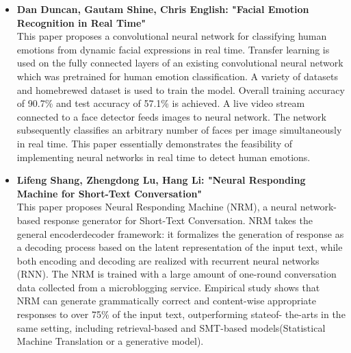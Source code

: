 \documentclass[oneside,a4paper,12pt]{report}
\begin{document}
\begin{normalsize}
\begin{itemize}
		\vspace{5mm}
	\item \textbf{Dan Duncan, Gautam Shine, Chris English:  "Facial Emotion Recognition in Real Time"} \cite{duncan16_facial_emotion_recog_real_time} \\
	This paper proposes a convolutional neural network for classifying human emotions from dynamic facial expressions in real time. Transfer learning is used on the fully connected layers of an existing convolutional neural network which was pretrained for human emotion classification. A variety of datasets and homebrewed dataset is used to train the model. Overall training accuracy of 90.7\% and test accuracy of 57.1\% is achieved. A live video stream connected to a face detector feeds images to neural network. The network subsequently classifies an arbitrary number of faces per image simultaneously in real time. This paper essentially demonstrates the feasibility of implementing neural networks in real time to detect human emotions.
	
		\vspace{5mm}
	\item \textbf{Lifeng Shang, Zhengdong Lu, Hang Li:  "Neural Responding Machine for Short-Text Conversation"} \cite{shang15_neural_respon_machin_short_text_conver} \\
	This paper proposes Neural Responding Machine (NRM), a neural network-based response generator for Short-Text Conversation. NRM takes the general encoderdecoder framework: it formalizes the generation of response as a decoding process based on the latent representation of the input text, while both encoding and decoding are realized with recurrent neural networks (RNN). The NRM is trained with a large amount of one-round conversation data collected from a microblogging service. Empirical study shows that NRM can generate grammatically correct and content-wise appropriate responses to over 75\% of the input text, outperforming stateof- the-arts in the same setting, including retrieval-based and SMT-based models(Statistical Machine Translation or a generative model).
	\vspace{5mm}
	

\end{itemize}
\end{normalsize}
\end{document}
